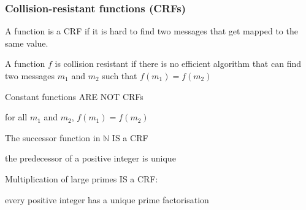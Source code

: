\documentclass[aspectratio=169, lualatex, 10pt,dvipsnames,svgnames]{beamer} %
\begin{document}
\begin{frame}

  \frametitle{Collision-resistant functions (CRFs)}

  A function is a CRF if it is hard to find two messages that get mapped to the same value.

  \begin{definition}
    A function $f$ is collision resistant if there is no efficient algorithm that can find two messages $m_1$ and $m_2$ such that $f(m_1) = f(m_2)$
  \end{definition}
  \bigskip{}
  \pause

  \color{vert}

  Constant functions ARE NOT CRFs
  
  \quad for all $m_1$ and $m_2$, $f(m_1) = f(m_2)$
  \bigskip{}
  \pause

  The successor function in $\mathbb N$ IS a CRF

  \quad the predecessor of a positive integer is unique
  \bigskip{} 
  \pause

  Multiplication of large primes IS a CRF:
    
  \quad every positive integer has a unique prime factorisation
  \color{black}


\end{frame}
\end{document}

